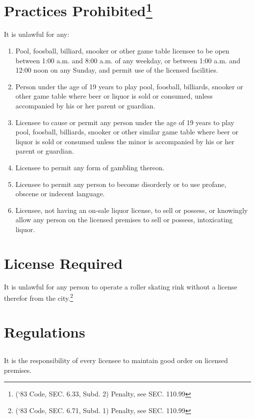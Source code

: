 \section{Practices Prohibited\footnote{(‘83 Code, SEC. 6.33, Subd. 2)  Penalty, see SEC. 110.99}}
It is unlawful for any:
\begin{enumerate}[{\indent}A)]
    \item Pool, foosball, billiard, snooker or other game table licensee to be open between 1:00 a.m. and 8:00 a.m. of any weekday, or between 1:00 a.m. and 12:00 noon on any Sunday, and permit use of the licensed facilities.
    \item Person under the age of 19 years to play pool, foosball, billiards, snooker or other game table where beer or liquor is sold or consumed, unless accompanied by his or her parent or guardian.
    \item Licensee to cause or permit any person under the age of 19 years to play pool, foosball, billiards, snooker or other similar game table where beer or liquor is sold or consumed unless the minor is accompanied by his or her parent or guardian.
    \item Licensee to permit any form of gambling thereon.
    \item Licensee to permit any person to become disorderly or to use profane, obscene or indecent language.
    \item Licensee, not having an on-sale liquor license, to sell or possess, or knowingly allow any person on the licensed premises to sell or possess, intoxicating liquor.
\end{enumerate}


\setcounter{section}{59}
\section{License Required}
It is unlawful for any person to operate a roller skating rink without a license therefor from the city.\footnote{(‘83 Code, SEC. 6.71, Subd. 1)  Penalty, see SEC. 110.99}

\section{Regulations}
\subsection{}
It is the responsibility of every licensee to maintain good order on licensed premises.
